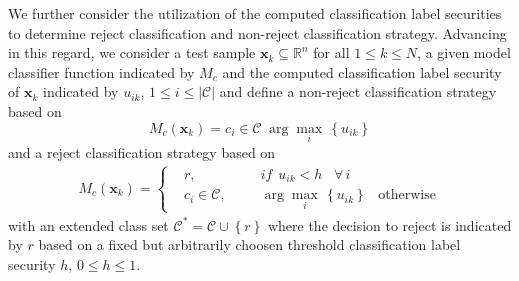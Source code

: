 We further consider the utilization of the computed classification label securities to determine reject classification and non-reject classification strategy\cite{hanczar2019performance}. Advancing in this regard, we consider a test sample \hspace{2pt}$\mathbf{x}_{k}\subseteq \mathbb{R}^n$\hspace{2pt} for all\hspace{2pt} $1\leq k \leq N$, a given model classifier function indicated by\hspace{2pt} $M_{c}$\hspace{2pt} and the computed classification label security of\hspace{2pt} $\mathbf{x}_{k}$\hspace{2pt} indicated by\hspace{2pt} $u_{ik}$,\hspace{2pt} $1\leq i \leq |\mathcal{C}|$\hspace{2pt} and define a non-reject classification strategy based on
\begin{equation}\label{non reject classification}
	M_{c}(\mathbf{x}_{k}) = c_{i}\in\mathcal{C} \hspace{3pt} \arg\max_i\hspace{2pt}\left\lbrace u_{ik}\right\rbrace 
\end{equation}
and a reject classification strategy based on 
\begin{align}\label{reject classification strategy}
	M_{c}(\mathbf{x}_{k})= 
	\left \{
	\begin{aligned}
		&r, &&  \hspace{10pt}if\hspace{5pt}u_{ik}< h\hspace{10pt} \forall\hspace{2pt} i  \\
		&c_{i}\in\mathcal{C}, &&  \hspace{10pt}\arg\max_i\hspace{2pt}\left\lbrace u_{ik}\right\rbrace \hspace{10pt}\text{otherwise}
	\end{aligned} \right.
\end{align}
with an extended class set\hspace{2pt} $\mathcal{C}^{\ast} = \mathcal{C}\cup \left\lbrace r\right\rbrace  $\hspace{2pt} where the decision to reject is indicated by\hspace{2pt} $r$\hspace{2pt} based on a fixed but arbitrarily choosen threshold classification label security \hspace{2pt}$h$,\hspace{2pt} $0\leq  h \leq 1$\cite{hanczar2019performance}.


